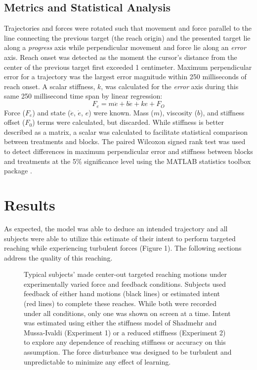 \documentclass[letterpaper, 10 pt, conference]{ieeeconf}  %
\begin{document}
\subsection*{Metrics and Statistical Analysis}
Trajectories and forces were rotated such that movement and force parallel to the line connecting the previous target (the reach origin) and the presented target lie along a \textit{progress} axis while perpendicular movement and force lie along an \textit{error} axis. Reach onset was detected as the moment the cursor's distance from the center of the previous target first exceeded 1 centimeter. Maximum perpendicular error for a trajectory was the largest error magnitude within 250 milliseconds of reach onset. A scalar stiffness, $k$, was calculated for the \textit{error} axis during this same 250 millisecond time span by linear regression:
\begin{equation}
F_e=m\ddot{e}+b\dot{e}+ke+F_O
\end{equation}
Force ($F_e$) and state ($\ddot{e}$, $\dot{e}$, $e$) were known. Mass ($m$), viscosity ($b$), and stiffness offset ($F_0$) terms were calculated, but discarded. While stiffness is better described as a matrix, a scalar was calculated to facilitate statistical comparison between treatments and blocks. The paired Wilcoxon signed rank test was used to detect differences in maximum perpendicular error and stiffness between blocks and treatments at the 5\% significance level using the MATLAB statistics toolbox package \cite{MATLAB:2014}.

\section{Results}
As expected, the model was able to deduce an intended trajectory and all subjects were able to utilize this estimate of their intent to perform targeted reaching while experiencing turbulent forces (Figure 1). The following sections address the quality of this reaching.

\begin{figure}[!b]
\centering
{}
\caption{Typical subjects' made center-out targeted reaching motions under experimentally varied force and feedback conditions. Subjects used feedback of either hand motions (black lines) or estimated intent (red lines) to complete these reaches. While both were recorded under all conditions, only one was shown on screen at a time. Intent was estimated using either the stiffness model of Shadmehr and Mussa-Ivaldi\cite{shadmehr1994adaptive} (Experiment 1) or a reduced stiffness (Experiment 2) to explore any dependence of reaching stiffness or accuracy on this assumption. The force disturbance was designed to be turbulent and unpredictable to minimize any effect of learning.}
\label{Yplots}
\end{figure}
\end{document}
